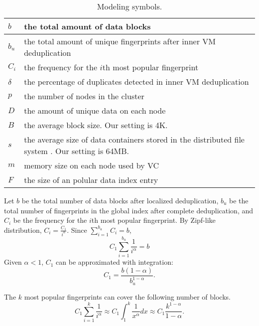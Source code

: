 \begin{table}[ht]
\centering
\begin{tabular}{|p{1.25cm}|p{6.5cm}|}
\hline
$b$ &  the total amount of data blocks\\ 
\hline
$b_u$ &  the total amount of unique fingerprints after inner VM  deduplication\\
\hline
$C_i$ &  the frequency for the $i$th most popular fingerprint\\
\hline
$\delta$ &  the percentage of duplicates detected in inner VM deduplication\\
\hline
$p$ & the number of nodes in the cluster\\
\hline
$D$ & the amount of unique data on each node\\
\hline
$B$ & the average block size. Our setting is  4K.\\
\hline
$s$ & the average size of data containers stored in the distributed file system . Our setting is  64MB.\\
\hline
$m$ & memory size on each node used by VC\\ 
\hline
$F$ & the size of an polular data index entry\\
\hline
\end{tabular}
\caption{Modeling  symbols.}
\label{tab:symbol}
\end{table}


Let $b$ be the total number of data blocks after localized deduplication, 
$b_u$ be the total number of fingerprints 
in the global index after complete deduplication, and
$C_i$ be the frequency for the $i$th most popular fingerprint. 
By Zipf-like distribution, $C_i = \frac{C_1}{i^\alpha}.$
Since $ \sum_{i=1}^{b_u}C_i = b$,
\[
C_1 \sum_{i=1}^{b_u}\frac{1}{i^\alpha} = b
\]
Given $\alpha <1$, $C_1$ can be approximated with integration:
\begin{equation}
C_1=\frac{b(1-\alpha)}{b_u^{1-\alpha}}.
\end{equation}


The  $k$ most popular fingerprints can cover the following number of blocks.
\[
C_1 \sum_{i=1}^{k}\frac{1}{i^\alpha} \approx  
C_1 \int_{1}^{k}\frac{1}{x^\alpha} dx  \approx  C_1\frac{  k^{1-\alpha}} {1-\alpha}.
\]

